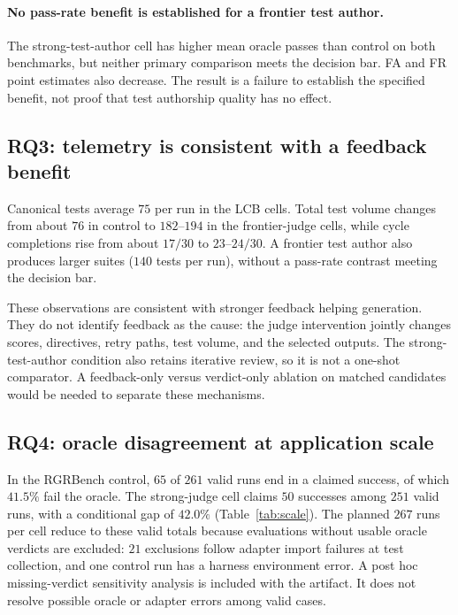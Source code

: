 \paragraph{No pass-rate benefit is established for a frontier test author.} The
strong-test-author cell has higher mean oracle passes than control on both benchmarks, but
neither primary comparison meets the decision bar. FA and FR point estimates also decrease.
The result is a failure to establish the specified benefit, not proof that test authorship
quality has no effect.

\subsection{RQ3: telemetry is consistent with a feedback benefit}
\label{sec:results-mech}

Canonical tests average $75$ per run in the LCB cells. Total test volume changes from about
$76$ in control to $182$--$194$ in the frontier-judge cells, while cycle completions rise from
about $17/30$ to $23$--$24/30$. A frontier test author also produces larger suites ($140$
tests per run), without a pass-rate contrast meeting the decision bar.

These observations are consistent with stronger feedback helping generation. They do not
identify feedback as the cause: the judge intervention jointly changes scores, directives,
retry paths, test volume, and the selected outputs. The strong-test-author condition also
retains iterative review, so it is not a one-shot comparator. A feedback-only versus
verdict-only ablation on matched candidates would be needed to separate these mechanisms.

\subsection{RQ4: oracle disagreement at application scale}
\label{sec:results-scale}

In the RGRBench control, $65$ of $261$ valid runs end in a claimed success, of which
$41.5\%$ fail the oracle. The strong-judge cell claims $50$ successes among $251$ valid runs,
with a conditional gap of $42.0\%$ (Table~\ref{tab:scale}). The planned $267$ runs per cell
reduce to these valid totals because evaluations without usable oracle verdicts are excluded:
$21$ exclusions follow adapter import failures at test collection, and one control run has a
harness environment error. A post hoc missing-verdict sensitivity analysis is included with
the artifact. It does not resolve possible oracle or adapter errors among valid cases.

